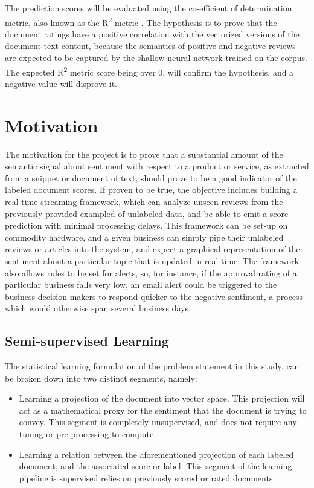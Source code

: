 \documentclass[conference]{IEEEtran}
\begin{document}
The prediction scores will be evaluated using the co-efficient of determination metric, also known as the R\textsuperscript{2} metric \cite{cameron1997r}. The hypothesis is to prove that the document ratings have a positive correlation with the vectorized versions of the document text content, because the semantics of positive and negative reviews are expected to be captured by the shallow neural network trained on the corpus. The expected R\textsuperscript{2} metric score being over 0, will confirm the hypothesis, and a negative value will disprove it.

\vspace{5mm}

\section{Motivation}
The motivation for the project is to prove that a substantial amount of the semantic signal about sentiment with respect to a product or service, as extracted from a snippet or document of text, should prove to be a good indicator of the labeled document scores. If proven to be true, the objective includes building a real-time streaming framework, which can analyze unseen reviews from the previously provided exampled of unlabeled data, and be able to emit a score-prediction with minimal processing delays. This framework can be set-up on commodity hardware, and a given business can simply pipe their unlabeled reviews or articles into the system, and expect a graphical representation of the sentiment about a particular topic that is updated in real-time. The framework also allows rules to be set for alerts, so, for instance, if the approval rating of a particular business falls very low, an email alert could be triggered to the business decision makers to respond quicker to the negative sentiment, a process which would otherwise span several business days.

\subsection{Semi-supervised Learning}
The statistical learning formulation of the problem statement in this study, can be broken down into two distinct segments, namely:
\begin{itemize}
	\item Learning a projection of the document into vector space. This projection will act as a mathematical proxy for the sentiment that the document is trying to convey. This segment is completely unsupervised, and does not require any tuning or pre-processing to compute.
  \item Learning a relation between the aforementioned projection of each labeled document, and the associated score or label. This segment of the learning pipeline is supervised relies on previously scored or rated documents.
\end{itemize}
\end{document}
